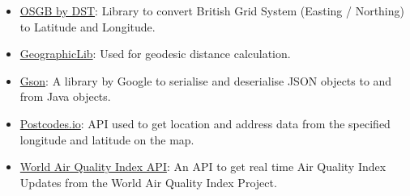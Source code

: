 \documentclass[10pt, a4paper]{scrartcl}
\begin{document}
\begin{multicols}{2}
\begin{itemize}
    \item \href{https://github.com/dstl/osgb}{OSGB by DST}: Library to convert British Grid System (Easting / Northing) to
    Latitude and Longitude.

    \item \href{https://github.com/geographiclib/}{GeographicLib}: Used for geodesic distance calculation.

    \item \href{https://github.com/google/gson}{Gson}: A library by Google to serialise and deserialise JSON objects to
    and from Java objects.

    \item \href{https://postcodes.io/}{Postcodes.io}: API used to get location and address data from the specified longitude
    and latitude on the map.

    \item \href{https://aqicn.org/api/}{World Air Quality Index API}: An API to get real time Air Quality Index Updates
    from the World Air Quality Index Project.
\end{itemize}
    
\end{multicols}
\end{document}
